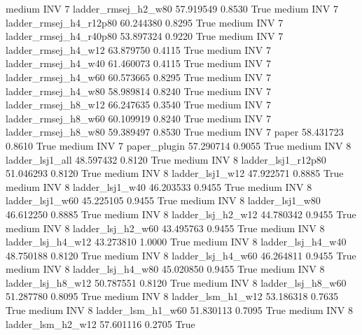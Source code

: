     medium      INV                 7    ladder_rmsej_h2_w80  57.919549      0.8530    True
    medium      INV                 7 ladder_rmsej_h4_r12p80  60.244380      0.8295    True
    medium      INV                 7 ladder_rmsej_h4_r40p80  53.897324      0.9220    True
    medium      INV                 7    ladder_rmsej_h4_w12  63.879750      0.4115    True
    medium      INV                 7    ladder_rmsej_h4_w40  61.460073      0.4115    True
    medium      INV                 7    ladder_rmsej_h4_w60  60.573665      0.8295    True
    medium      INV                 7    ladder_rmsej_h4_w80  58.989814      0.8240    True
    medium      INV                 7    ladder_rmsej_h8_w12  66.247635      0.3540    True
    medium      INV                 7    ladder_rmsej_h8_w60  60.109919      0.8240    True
    medium      INV                 7    ladder_rmsej_h8_w80  59.389497      0.8530    True
    medium      INV                 7                  paper  58.431723      0.8610    True
    medium      INV                 7           paper_plugin  57.290714      0.9055    True
    medium      INV                 8        ladder_lsj1_all  48.597432      0.8120    True
    medium      INV                 8     ladder_lsj1_r12p80  51.046293      0.8120    True
    medium      INV                 8        ladder_lsj1_w12  47.922571      0.8885    True
    medium      INV                 8        ladder_lsj1_w40  46.203533      0.9455    True
    medium      INV                 8        ladder_lsj1_w60  45.225105      0.9455    True
    medium      INV                 8        ladder_lsj1_w80  46.612250      0.8885    True
    medium      INV                 8      ladder_lsj_h2_w12  44.780342      0.9455    True
    medium      INV                 8      ladder_lsj_h2_w60  43.495763      0.9455    True
    medium      INV                 8      ladder_lsj_h4_w12  43.273810      1.0000    True
    medium      INV                 8      ladder_lsj_h4_w40  48.750188      0.8120    True
    medium      INV                 8      ladder_lsj_h4_w60  46.264811      0.9455    True
    medium      INV                 8      ladder_lsj_h4_w80  45.020850      0.9455    True
    medium      INV                 8      ladder_lsj_h8_w12  50.787551      0.8120    True
    medium      INV                 8      ladder_lsj_h8_w60  51.287780      0.8095    True
    medium      INV                 8      ladder_lsm_h1_w12  53.186318      0.7635    True
    medium      INV                 8      ladder_lsm_h1_w60  51.830113      0.7095    True
    medium      INV                 8      ladder_lsm_h2_w12  57.601116      0.2705    True
